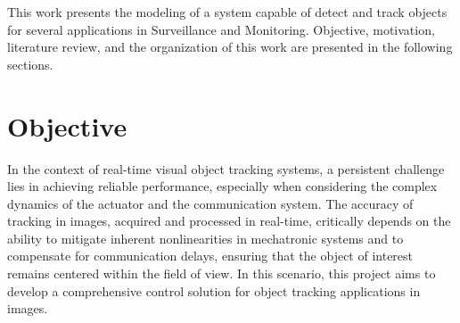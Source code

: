 This work presents the modeling of a system capable of detect and track objects for several applications in Surveillance and Monitoring. Objective, motivation, literature review, and the organization of this work are presented in the following sections.

\section{Objective}
In the context of real-time visual object tracking systems, a persistent challenge lies in achieving reliable performance, especially when considering the complex dynamics of the actuator and the communication system. The accuracy of tracking in images, acquired and processed in real-time, critically depends on the ability to mitigate inherent nonlinearities in mechatronic systems and to compensate for communication delays, ensuring that the object of interest remains centered within the field of view. In this scenario, this project aims to develop a comprehensive control solution for object tracking applications in images.

